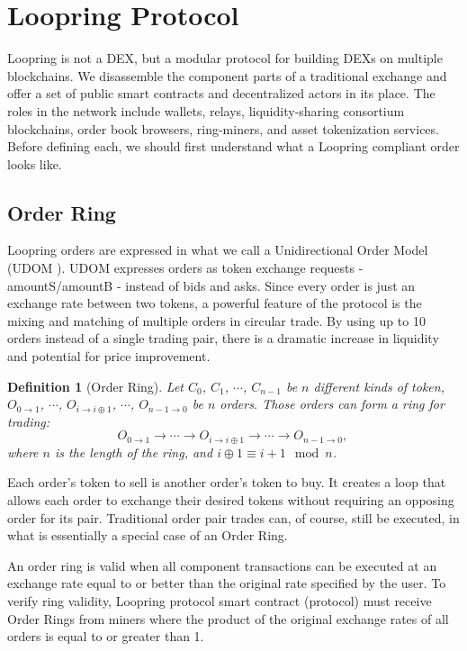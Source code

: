 \documentclass[UTF8,nofonts]{article}
\newtheorem{definition}{Definition}[section]
\begin{document}
\section{Loopring Protocol\label{sec:loopring_protocol}}
Loopring is not a DEX, but a modular protocol for building DEXs on multiple blockchains. We disassemble the component parts of a traditional exchange and offer a set of public smart contracts and decentralized actors in its place. The roles in the network include wallets, relays, liquidity-sharing consortium blockchains, order book browsers, ring-miners, and asset tokenization services. Before defining each, we should first understand what a Loopring compliant order looks like. 

\subsection{Order Ring}
Loopring orders are expressed in what we call a Unidirectional Order Model (UDOM \cite{coinport2014udom}). UDOM expresses orders as token exchange requests - amountS/amountB - instead of bids and asks. Since every order is just an exchange rate between two tokens, a powerful feature of the protocol is the mixing and matching of multiple orders in circular trade. By using up to 10 orders instead of a single trading pair, there is a dramatic increase in liquidity and potential for price improvement. 


\begin{definition}[Order Ring] Let $C_{0}$, $C_{1}$, $\cdots$, $C_{n-1}$ be $n$ different kinds of token, $O_{0\rightarrow 1}$, $\cdots$, $O_{i\rightarrow i\oplus 1}$, $\cdots$, $O_{n-1 \rightarrow 0}$ be $n$ orders. Those orders can form a ring for trading:
$$O_{0\rightarrow 1} \rightarrow \cdots \rightarrow O_{i\rightarrow i\oplus 1} \rightarrow \cdots \rightarrow O_{n-1\rightarrow 0} \text{, }$$
where $n$ is the length of the ring, and $i\oplus 1 \equiv i+1 \mod n$.
\end{definition}

Each order's token to sell is another order's token to buy. It creates a loop that allows each order to exchange their desired tokens without requiring an opposing order for its pair. Traditional order pair trades can, of course, still be executed, in what is essentially a special case of an Order Ring. 

An order ring is valid when all component transactions can be executed at an exchange rate equal to or better than the original rate specified by the user. To verify ring validity, Loopring protocol smart contract (protocol) must receive Order Rings from miners where the product of the original exchange rates of all orders is equal to or greater than 1.
\end{document}
